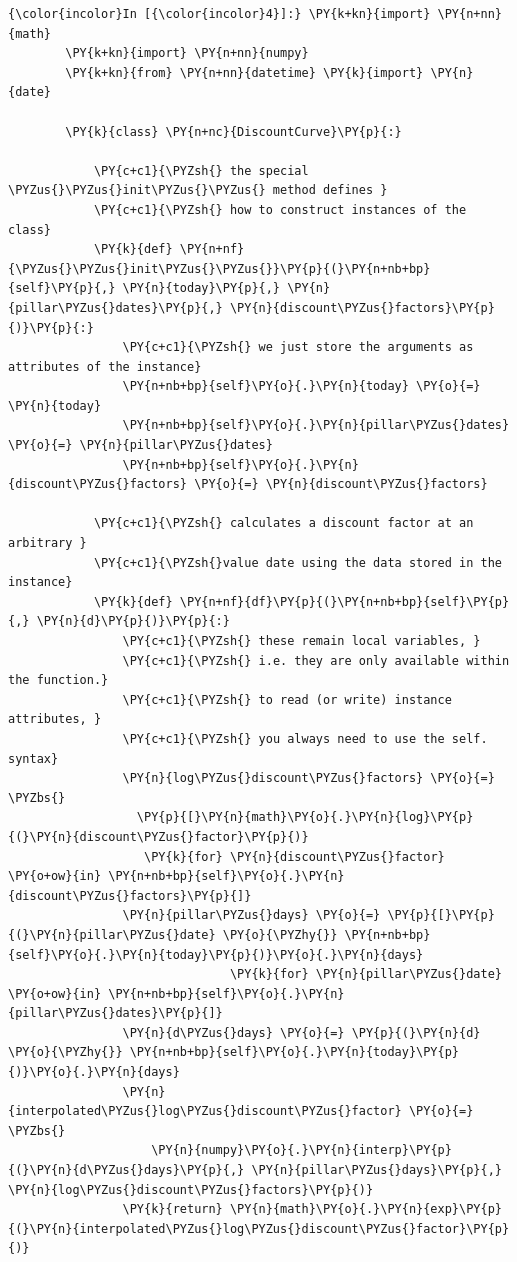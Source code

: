     \begin{Verbatim}[commandchars=\\\{\}]
{\color{incolor}In [{\color{incolor}4}]:} \PY{k+kn}{import} \PY{n+nn}{math}
        \PY{k+kn}{import} \PY{n+nn}{numpy}
        \PY{k+kn}{from} \PY{n+nn}{datetime} \PY{k}{import} \PY{n}{date}
        
        \PY{k}{class} \PY{n+nc}{DiscountCurve}\PY{p}{:}
        
            \PY{c+c1}{\PYZsh{} the special \PYZus{}\PYZus{}init\PYZus{}\PYZus{} method defines }
            \PY{c+c1}{\PYZsh{} how to construct instances of the class}
            \PY{k}{def} \PY{n+nf}{\PYZus{}\PYZus{}init\PYZus{}\PYZus{}}\PY{p}{(}\PY{n+nb+bp}{self}\PY{p}{,} \PY{n}{today}\PY{p}{,} \PY{n}{pillar\PYZus{}dates}\PY{p}{,} \PY{n}{discount\PYZus{}factors}\PY{p}{)}\PY{p}{:}
                \PY{c+c1}{\PYZsh{} we just store the arguments as attributes of the instance}
                \PY{n+nb+bp}{self}\PY{o}{.}\PY{n}{today} \PY{o}{=} \PY{n}{today}
                \PY{n+nb+bp}{self}\PY{o}{.}\PY{n}{pillar\PYZus{}dates} \PY{o}{=} \PY{n}{pillar\PYZus{}dates}
                \PY{n+nb+bp}{self}\PY{o}{.}\PY{n}{discount\PYZus{}factors} \PY{o}{=} \PY{n}{discount\PYZus{}factors}
        
            \PY{c+c1}{\PYZsh{} calculates a discount factor at an arbitrary }
            \PY{c+c1}{\PYZsh{}value date using the data stored in the instance}
            \PY{k}{def} \PY{n+nf}{df}\PY{p}{(}\PY{n+nb+bp}{self}\PY{p}{,} \PY{n}{d}\PY{p}{)}\PY{p}{:}
                \PY{c+c1}{\PYZsh{} these remain local variables, }
                \PY{c+c1}{\PYZsh{} i.e. they are only available within the function.}
                \PY{c+c1}{\PYZsh{} to read (or write) instance attributes, }
                \PY{c+c1}{\PYZsh{} you always need to use the self. syntax}
                \PY{n}{log\PYZus{}discount\PYZus{}factors} \PY{o}{=} \PYZbs{}
                  \PY{p}{[}\PY{n}{math}\PY{o}{.}\PY{n}{log}\PY{p}{(}\PY{n}{discount\PYZus{}factor}\PY{p}{)} 
                   \PY{k}{for} \PY{n}{discount\PYZus{}factor} \PY{o+ow}{in} \PY{n+nb+bp}{self}\PY{o}{.}\PY{n}{discount\PYZus{}factors}\PY{p}{]}
                \PY{n}{pillar\PYZus{}days} \PY{o}{=} \PY{p}{[}\PY{p}{(}\PY{n}{pillar\PYZus{}date} \PY{o}{\PYZhy{}} \PY{n+nb+bp}{self}\PY{o}{.}\PY{n}{today}\PY{p}{)}\PY{o}{.}\PY{n}{days} 
                               \PY{k}{for} \PY{n}{pillar\PYZus{}date} \PY{o+ow}{in} \PY{n+nb+bp}{self}\PY{o}{.}\PY{n}{pillar\PYZus{}dates}\PY{p}{]}
                \PY{n}{d\PYZus{}days} \PY{o}{=} \PY{p}{(}\PY{n}{d} \PY{o}{\PYZhy{}} \PY{n+nb+bp}{self}\PY{o}{.}\PY{n}{today}\PY{p}{)}\PY{o}{.}\PY{n}{days}
                \PY{n}{interpolated\PYZus{}log\PYZus{}discount\PYZus{}factor} \PY{o}{=} \PYZbs{}
                    \PY{n}{numpy}\PY{o}{.}\PY{n}{interp}\PY{p}{(}\PY{n}{d\PYZus{}days}\PY{p}{,} \PY{n}{pillar\PYZus{}days}\PY{p}{,} \PY{n}{log\PYZus{}discount\PYZus{}factors}\PY{p}{)}
                \PY{k}{return} \PY{n}{math}\PY{o}{.}\PY{n}{exp}\PY{p}{(}\PY{n}{interpolated\PYZus{}log\PYZus{}discount\PYZus{}factor}\PY{p}{)}
        

\end{Verbatim}
